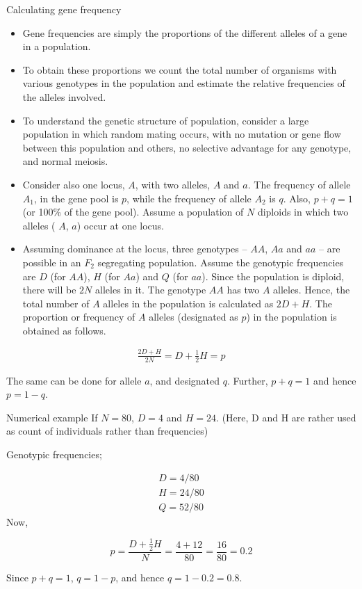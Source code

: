 \documentclass[11pt,ignorenonframetext,aspectratio=169]{beamer}
\begin{document}
\begin{frame}{Calculating gene frequency}
\protect\hypertarget{calculating-gene-frequency}{}
\begin{itemize}
\item
  Gene frequencies are simply the proportions of the different alleles
  of a gene in a population.
\item
  To obtain these proportions we count the total number of organisms
  with various genotypes in the population and estimate the relative
  frequencies of the alleles involved.
\item
  To understand the genetic structure of population, consider a large
  population in which random mating occurs, with no mutation or gene
  flow between this population and others, no selective advantage for
  any genotype, and normal meiosis.
\item
  Consider also one locus, \(A\), with two alleles, \(A\) and \(a\). The
  frequency of allele \(A_1\), in the gene pool is \(p\), while the
  frequency of allele \(A_2\) is \(q\). Also, \(p + q = 1\) (or 100\% of
  the gene pool). Assume a population of \(N\) diploids in which two
  alleles ( \(A\), \(a\)) occur at one locus.
\item
  Assuming dominance at the locus, three genotypes -- \(AA\), \(Aa\) and
  \(aa\) -- are possible in an \(F_2\) segregating population. Assume
  the genotypic frequencies are \(D\) (for \(AA\)), \(H\) (for \(Aa\))
  and \(Q\) (for \(aa\)). Since the population is diploid, there will be
  \(2N\) alleles in it. The genotype \(AA\) has two \(A\) alleles.
  Hence, the total number of \(A\) alleles in the population is
  calculated as \(2D + H\). The proportion or frequency of \(A\) alleles
  (designated as \(p\)) in the population is obtained as follows.
\end{itemize}

\[
\begin{aligned}
\frac{2D + H}{2N} = D + \frac{1}{2}H = p
\end{aligned}
\]

The same can be done for allele \(a\), and designated \(q\). Further,
\(p + q = 1\) and hence \(p = 1-q\).
\end{frame}

\begin{frame}{Numerical example}
\protect\hypertarget{numerical-example}{}
If \(N = 80\), \(D = 4\) and \(H = 24\). (Here, D and H are rather used
as count of individuals rather than frequencies)

Genotypic frequencies;

\[
\begin{aligned}
D = 4/80 \\
H = 24/80 \\
Q = 52/80
\end{aligned}
\] Now,

\[
p = \frac{D + \frac{1}{2}H}{N} = \frac{4 + 12}{80} = \frac{16}{80} = 0.2
\]

Since \(p + q = 1\), \(q = 1-p\), and hence \(q = 1-0.2 = 0.8\).
\end{frame}
\end{document}
